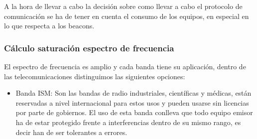 \documentclass[a4paper ,12pt, onecolumn]{article}
\begin{document}
            A la hora de llevar a cabo la decisión sobre como llevar a cabo el protocolo de comunicación se ha de tener en cuenta 
            el consumo de los equipos, en especial en lo que respecta a los beacons.

            \subsubsection{Cálculo saturación espectro de frecuencia}
            El espectro de frecuencia es amplio y cada banda tiene su aplicación, dentro de las telecomunicaciones
            distinguimos las siguientes opciones:
            \begin{itemize}
                \item Banda ISM: Son las bandas de radio industriales, científicas y médicas, están reservadas a 
                nivel internacional para estos usos y pueden usarse sin licencias por parte de gobiernos. El uso de esta
                banda conlleva que todo equipo emisor ha de estar protegido frente a interferencias dentro de su mismo 
                rango, es decir han de ser tolerantes a errores.
    

\end{itemize}
\end{document}

